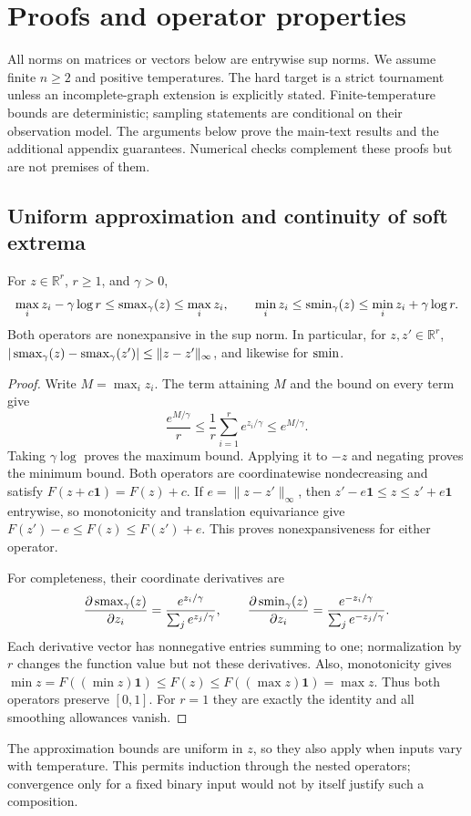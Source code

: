\section{Proofs and operator properties}\label{app:proofs}
All norms on matrices or vectors below are entrywise sup norms. We assume finite $n\ge2$ and positive temperatures. The hard target is a strict tournament unless an incomplete-graph extension is explicitly stated. Finite-temperature bounds are deterministic; sampling statements are conditional on their observation model. The arguments below prove the main-text results and the additional appendix guarantees. Numerical checks complement these proofs but are not premises of them.

\subsection{Uniform approximation and continuity of soft extrema}
\begin{lemma}\label{lem:extrema}
For $z\in\mathbb R^r$, $r\ge1$, and $\gamma>0$,
\[
\max_i z_i-\gamma\log r\le\operatorname{smax}_\gamma(z)\le\max_i z_i,
\qquad
\min_i z_i\le\operatorname{smin}_\gamma(z)\le\min_i z_i+\gamma\log r.
\]
Both operators are nonexpansive in the sup norm. In particular, for $z,z'\in\mathbb R^r$,
$|\operatorname{smax}_\gamma(z)-\operatorname{smax}_\gamma(z')|\le\|z-z'\|_\infty$, and likewise for $\operatorname{smin}$.
\end{lemma}
\begin{proof}
Write $M=\max_i z_i$. The term attaining $M$ and the bound on every term give
\[
\frac{e^{M/\gamma}}r\le\frac1r\sum_{i=1}^r e^{z_i/\gamma}\le e^{M/\gamma}.
\]
Taking $\gamma\log$ proves the maximum bound. Applying it to $-z$ and negating proves the minimum bound. Both operators are coordinatewise nondecreasing and satisfy $F(z+c\mathbf1)=F(z)+c$. If $e=\|z-z'\|_\infty$, then $z'-e\mathbf1\le z\le z'+e\mathbf1$ entrywise, so monotonicity and translation equivariance give $F(z')-e\le F(z)\le F(z')+e$. This proves nonexpansiveness for either operator.

For completeness, their coordinate derivatives are
\[
\frac{\partial\operatorname{smax}_\gamma(z)}{\partial z_i}
=\frac{e^{z_i/\gamma}}{\sum_j e^{z_j/\gamma}},\qquad
\frac{\partial\operatorname{smin}_\gamma(z)}{\partial z_i}
=\frac{e^{-z_i/\gamma}}{\sum_j e^{-z_j/\gamma}}.
\]
Each derivative vector has nonnegative entries summing to one; normalization by $r$ changes the function value but not these derivatives. Also, monotonicity gives $\min z=F((\min z)\mathbf1)\le F(z)\le F((\max z)\mathbf1)=\max z$. Thus both operators preserve $[0,1]$. For $r=1$ they are exactly the identity and all smoothing allowances vanish.
\end{proof}
The approximation bounds are uniform in $z$, so they also apply when inputs vary with temperature. This permits induction through the nested operators; convergence only for a fixed binary input would not by itself justify such a composition.

